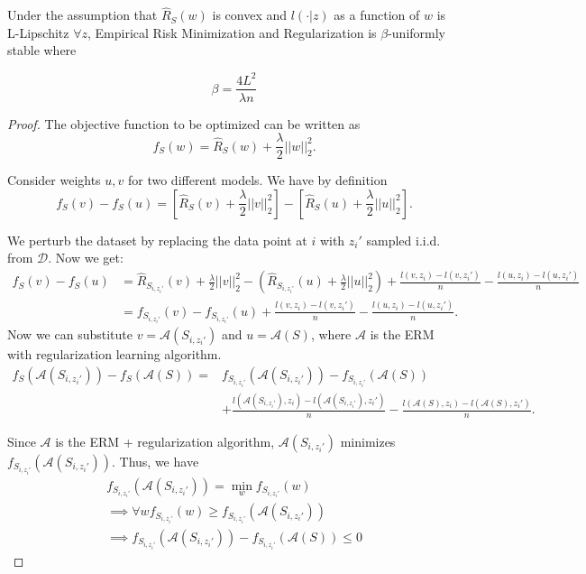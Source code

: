 \documentclass{article}
\begin{document}
\begin{thm}
Under the assumption that $\hat{R}_S(w)$ is convex and $l(\cdot|z)$ as a function of $w$ is L-Lipschitz $\forall z$, Empirical Risk Minimization and Regularization is $\beta$-uniformly stable where

\[
\beta = \frac{4L^2}{\lambda n}
\]
\end{thm}
\begin{proof}
The objective function to be optimized can be written as
$$f_S(w)=\hat{R}_S(w) + \frac{\lambda}{2}||w||_2^2.$$

Consider weights $u,v$ for two different models. We have by definition
$$f_S(v) - f_S(u) = [\hat{R}_S(v) + \frac{\lambda}{2}||v||_2^2] - [\hat{R}_S(u) + \frac{\lambda}{2}||u||_2^2].$$

We perturb the dataset by replacing the data point at $i$ with $z_i'$ sampled i.i.d. from $\mathcal{D}$. Now we get:
\begin{align*}
    f_S(v) - f_S(u) &= \hat{R}_{S_{i,z_i'}}(v) + \frac{\lambda}{2}||v||_2^2 - (\hat{R}_{S_{i,z_i'}}(u) + \frac{\lambda}{2}||u||^2_2) + \frac{l(v, z_i) - l(v, z_i')}{n} - \frac{l(u, z_i) - l(u,z_i')}{n} \\
    &= f_{S_{i,z_i'}}(v) - f_{S_{i,z_i'}}(u) + \frac{l(v, z_i) - l(v, z_i')}{n} - \frac{l(u, z_i) - l(u,z_i')}{n}.
\end{align*}
Now we can substitute $v=\mathcal{A}(S_{i,z_i'})$ and $u=\mathcal{A}(S)$, where $\mathcal{A}$ is the ERM with regularization learning algorithm.
\begin{align*}
    f_S(\mathcal{A}(S_{i,z_i'})) - f_S(\mathcal{A}(S)) 
    =& f_{S_{i,z_i'}}(\mathcal{A}(S_{i,z_i'})) - f_{S_{i,z_i'}}(\mathcal{A}(S)) \\ &+ \frac{l(\mathcal{A}(S_{i,z_i'}), z_i) - l(\mathcal{A}(S_{i,z_i'}), z_i')}{n} - \frac{l(\mathcal{A}(S), z_i) - l(\mathcal{A}(S),z_i')}{n}.
\end{align*}

Since $\mathcal{A}$ is the ERM + regularization algorithm, $\mathcal{A}(S_{i, z_i'})$ minimizes $f_{S_{i, z_i'}}(\mathcal{A}(S_{i, z_i'}))$. Thus, we have 
\begin{align*}
f_{S_{i,z_i'}}(\mathcal{A}(S_{i, z_i'})) = \min_w f_{S_{i,z_i'}}(w) \\
\implies \forall w f_{S_{i,z_i'}}(w) \geq f_{S_{i,z_i'}}(\mathcal{A}(S_{i, z_i'}))\\
\implies f_{S_{i,z_i'}}(\mathcal{A}(S_{i,z_i'})) - f_{S_{i,z_i'}}(\mathcal{A}(S)) \leq 0
\end{align*}


\end{proof}
\end{document}
